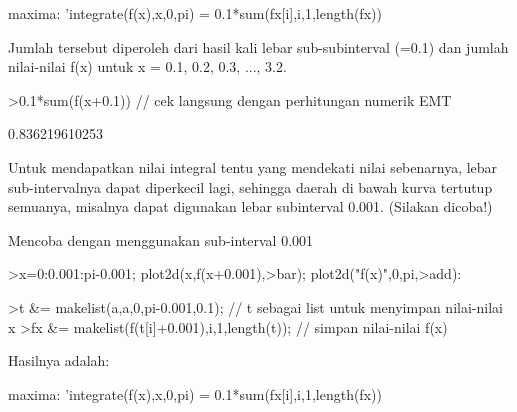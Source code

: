 \documentclass{article}
\begin{document}
\begin{eulernotebook}
\begin{eulercomment}
\begin{eulercomment}
\begin{eulercomment}
maxima: 'integrate(f(x),x,0,pi) = 0.1*sum(fx[i],i,1,length(fx))

Jumlah tersebut diperoleh dari hasil kali lebar sub-subinterval (=0.1) dan jumlah
nilai-nilai f(x) untuk x = 0.1, 0.2, 0.3, ..., 3.2.
\end{eulercomment}
\begin{eulerprompt}
>0.1*sum(f(x+0.1)) // cek langsung dengan perhitungan numerik EMT
\end{eulerprompt}
\begin{euleroutput}
  0.836219610253
\end{euleroutput}
\begin{eulercomment}
Untuk mendapatkan nilai integral tentu yang mendekati nilai
sebenarnya, lebar sub-intervalnya dapat diperkecil lagi, sehingga
daerah di bawah kurva tertutup semuanya, misalnya dapat digunakan
lebar subinterval 0.001. (Silakan dicoba!)\\
\end{eulercomment}
\eulersubheading{}
\begin{eulercomment}
Mencoba dengan menggunakan sub-interval 0.001
\end{eulercomment}
\begin{eulerprompt}
>x=0:0.001:pi-0.001; plot2d(x,f(x+0.001),>bar); plot2d("f(x)",0,pi,>add):
\end{eulerprompt}
\begin{eulerprompt}
>t &= makelist(a,a,0,pi-0.001,0.1); // t sebagai list untuk menyimpan nilai-nilai x
>fx &= makelist(f(t[i]+0.001),i,1,length(t)); // simpan nilai-nilai f(x)
\end{eulerprompt}
\begin{eulercomment}
Hasilnya adalah:

maxima: 'integrate(f(x),x,0,pi) = 0.1*sum(fx[i],i,1,length(fx))


\end{eulercomment}
\end{eulercomment}
\end{eulercomment}
\end{eulernotebook}
\end{document}
